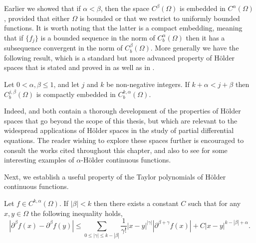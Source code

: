\documentclass[oneside,hidelinks,indentfirst,10pt]{book}
\begin{document}
Earlier we showed that if \(\alpha< \beta\), then the space \(C^{\beta}(\Omega)\) is embedded in \(C^{\alpha}(\Omega)\), provided that either \(\Omega\) is bounded or that we restrict to uniformly bounded functions. It is worth noting that the latter is a compact embedding, meaning that if \(\{f_j\}\) is a bounded sequence in the norm of \(C_b^\alpha(\Omega)\) then it has a subsequence convergent in the norm of \(C_b^\beta(\Omega)\). More generally we have the following result, which is a standard but more advanced property of H\"older spaces that is stated and proved in \cite[Lemma 6.33]{GilbargTrudinger} as well as in \cite[Theorem 24.14]{Driver}.


\begin{lem}\label{lem:cptmb}
Let \(0<\alpha,\beta\leq 1\), and let \(j\) and \(k\) be non-negative integers. If \(k+\alpha<j+\beta\) then \(C_b^{j,\beta}(\Omega)\) is compactly embedded in \(C_b^{k,\alpha}(\Omega)\).
\end{lem}


Indeed, \cite{GilbargTrudinger} and \cite{Driver} both contain a thorough development of the properties of H\"older spaces that go beyond the scope of this thesis, but which are relevant to the widespread applications of H\"older spaces in the study of partial differential equations. The reader wishing to explore these spaces further is encouraged to consult the works cited throughout this chapter, and also to see  for some interesting examples of \(\alpha\)-H\"older continuous functions. 


Next, we establish a useful property of the Taylor polynomials of H\"older continuous functions.


\begin{lem}\label{lem:Taylorest}
Let \(f\in C^{k,\alpha}(\Omega)\). If \(|\beta|<k\) then there exists a constant \(C\) such that for any \(x,y\in\Omega\) the following inequality holds,
\begin{equation}\label{eq:taylorest}
    |\partial^\beta f(x)-\partial^\beta f(y)|\leq \sum_{0\leq |\gamma|\leq k-|\beta|}\frac{1}{\gamma!}|x-y|^{|\gamma|}|\partial^{\beta+\gamma} f(x)|+C|x-y|^{k-|\beta|+\alpha}.    
\end{equation}
\end{lem}
\end{document}
